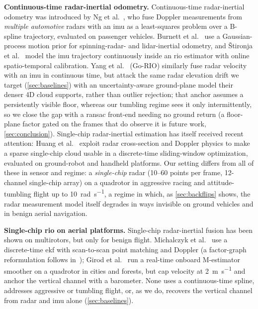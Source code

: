 \textbf{Continuous-time radar-inertial odometry.}
Continuous-time radar-inertial odometry was introduced by
Ng et al.~\cite{ng2021ctrio}, who fuse Doppler measurements from
\emph{multiple automotive} radars with an \ac{imu} as a least-squares
problem over a B-spline trajectory, evaluated on passenger vehicles.
Burnett et al.~\cite{burnett2024gp} use a Gaussian-process motion
prior for spinning-radar- and lidar-inertial odometry, and
\v{S}tironja et al.~\cite{stironja2026rio} model the \ac{imu} trajectory
continuously inside an \ac{rio} estimator with online spatio-temporal
calibration.  Yang et al.~\cite{yang2025gorio} (Go-RIO)
similarly fuse radar velocity with an \ac{imu} in continuous time, but
attack the same radar elevation drift we target
(\autoref{sec:baselines}) with an uncertainty-aware ground-plane model
their denser 4D cloud supports,
rather than outlier rejection; that anchor assumes a persistently
visible floor, whereas our tumbling regime sees it only intermittently,
so we close the gap with a \ac{ransac} front-end needing no ground return
(a floor-plane factor gated on the frames that do observe it is future
work, \autoref{sec:conclusion}).  Single-chip radar-inertial estimation has itself
received recent attention: Huang et al.~\cite{huang2024lessismore}
exploit radar cross-section and Doppler physics to make a sparse
single-chip cloud usable in a discrete-time sliding-window
optimization, evaluated on ground-robot and handheld platforms.
Our setting differs from all of these in sensor and
regime: a \emph{single-chip} radar (10--60 points per frame,
12-channel single-chip array) on a quadrotor in aggressive racing and
attitude-tumbling flight up to \SI{10}{\radian\per\second}, a
regime in which, as \autoref{sec:backflips} shows, the radar
measurement model itself degrades in ways invisible on ground
vehicles and in benign aerial navigation.

\textbf{Single-chip \ac{rio} on aerial platforms.}
Single-chip radar-inertial fusion has been shown on multirotors, but only
for benign flight.  Michalczyk et al.~\cite{michalczyk2022ekf} use a
discrete-time \ac{ekf} with scan-to-scan point matching and Doppler (a
factor-graph reformulation follows in~\cite{michalczyk2024fg}); Girod et
al.~\cite{girod2024brio} run a real-time onboard M-estimator smoother on a
quadrotor in cities and forests, but cap velocity at
\SI{2}{\metre\per\second} and anchor the vertical channel with a
barometer.  None uses a continuous-time spline, addresses aggressive or
tumbling flight, or, as we do, recovers the vertical channel from radar
and \ac{imu} alone (\autoref{sec:baselines}).

